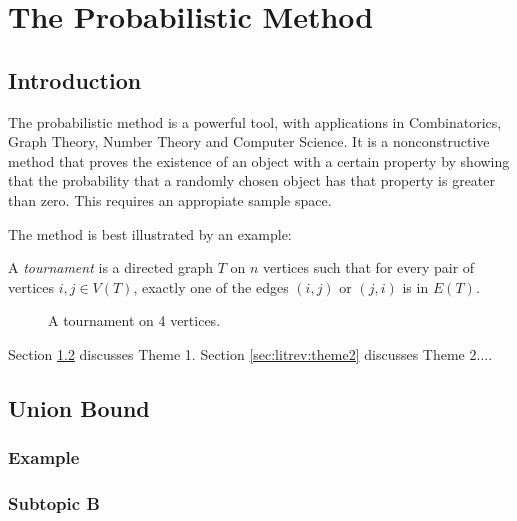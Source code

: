 \chapter{The Probabilistic Method}\label{chap:litrev}

\section{Introduction}\label{sec:litrev:intro}

The probabilistic method is a powerful tool, with applications in Combinatorics, Graph Theory, Number Theory and Computer Science. It is a nonconstructive method that proves the existence of an object with a certain property by showing that the probability that a randomly chosen object has that property is greater than zero. This requires an appropiate sample space. \par

The method is best illustrated by an example: \par

\begin{definition}\label{def:tournament}
A \textit{tournament} is a directed graph $T$ on $n$ vertices such that for every pair of vertices $i, j \in V(T)$, exactly one of the edges $(i, j)$ or $(j, i)$ is in $E(T)$. \cite{alon2016probabilistic}
\end{definition}

\begin{figure}
    \centering
    \caption{A tournament on 4 vertices.}
    \label{fig:tournament}
\end{figure}

Section \ref{sec:litrev:theme1} discusses Theme 1. Section \ref{sec:litrev:theme2} discusses Theme 2....

\section{Union Bound}\label{sec:litrev:theme1}


\subsection{Example}\label{sec:litrev:theme1:A}

\subsection{Subtopic B}\label{sec:litrev:theme1:B}

